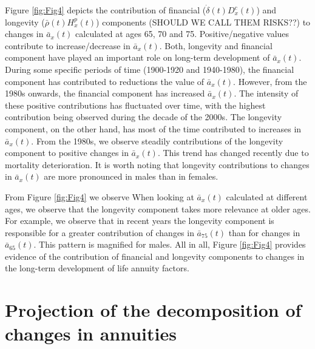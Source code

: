 \documentclass[12pt]{article}
\begin{document}
Figure \ref{fig:Fig4} depicts the contribution of financial ($\dot{\delta}(t){D}^{c}_x(t)$) and longevity ($\bar{\rho}(t){H}^{p}_x(t)$) components (SHOULD WE CALL THEM RISKS??) to changes in $\bar{a}_x(t)$ calculated at ages 65, 70 and 75. Positive/negative values contribute to increase/decrease in $\bar{a}_x(t)$. Both, longevity and financial component have played an important role on long-term development of $\bar{a}_x(t)$. During some specific periods of time (1900-1920 and 1940-1980), the financial component has contributed to reductions the value of $\bar{a}_x(t)$. However, from the 1980s onwards, the financial component has increased $\bar{a}_x(t)$. The intensity of these positive contributions has fluctuated over time, with the highest contribution being observed during the decade of the 2000s. The longevity component, on the other hand, has most of the time contributed to increases in $\bar{a}_x(t)$. From the 1980s, we observe steadily contributions of the longevity component to positive changes in $\bar{a}_x(t)$. This trend has changed recently due to mortality deterioration. It is worth noting that longevity contributions to changes in $\bar{a}_x(t)$ are more pronounced in males than in females.

From Figure \ref{fig:Fig4} we observe When looking at $\bar{a}_x(t)$ calculated at different ages, we observe that the longevity component takes more relevance at older ages. For example, we observe that in recent years the longevity component is responsible for a greater contribution of changes in $\bar{a}_{75}(t)$ than for changes in $\bar{a}_{65}(t)$. This pattern is magnified for males. All in all, Figure \ref{fig:Fig4} provides evidence of the contribution of financial and longevity components to changes in the long-term development of life annuity factors.

















\FloatBarrier
\section{Projection of the decomposition of changes in annuities}
\end{document}
